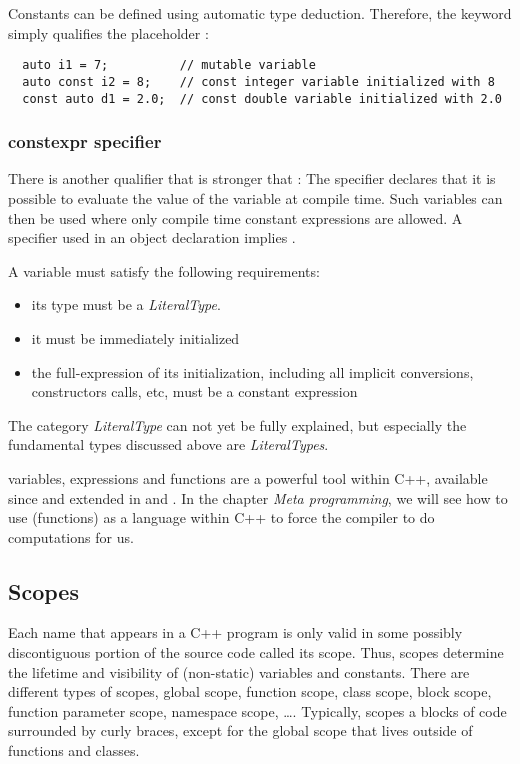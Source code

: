 Constants can be defined using automatic type deduction. Therefore, the keyword  simply qualifies the placeholder :
%
\begin{verbatim}
  auto i1 = 7;          // mutable variable
  auto const i2 = 8;    // const integer variable initialized with 8
  const auto d1 = 2.0;  // const double variable initialized with 2.0
\end{verbatim}

\subsubsection{constexpr specifier}
There is another qualifier that is stronger that : The  specifier declares that it is possible to evaluate the
value of the variable at compile time. Such variables can then be used where only compile time constant expressions are allowed.
A  specifier used in an object declaration implies .

A  variable must satisfy the following requirements:
\begin{itemize}
  \item its type must be a \emph{LiteralType}.
  \item it must be immediately initialized
  \item the full-expression of its initialization, including all implicit conversions, constructors calls, etc, must be a constant expression
\end{itemize}

The category \emph{LiteralType} can not yet be fully explained, but especially the fundamental types discussed above are \emph{LiteralTypes}.

\begin{rem}
   variables, expressions and functions are a powerful tool within C++, available since  and extended in  and .
  In the chapter \emph{Meta programming}, we will see how to use  (functions) as a language within C++ to force the compiler to
  do computations for us.
\end{rem}


\subsection{Scopes}
Each name that appears in a C++ program is only valid in some possibly discontiguous portion of the source code called its scope. Thus,
scopes determine the lifetime and visibility of (non-static) variables and constants. There are different types of scopes,
global scope, function scope, class scope, block scope, function parameter scope, namespace scope, \dots. Typically, scopes a blocks of
code surrounded by curly braces, except for the global scope that lives outside of functions and classes.

